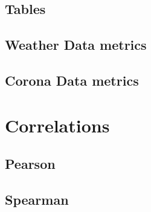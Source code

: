 
\begin{landscape}
\newpage

\section{Tables}
\subsection{Weather Data metrics}


\subsection{Corona Data metrics}

\end{landscape}

\newpage
\section{Correlations}
\subsection{Pearson}


\subsection{Spearman}

